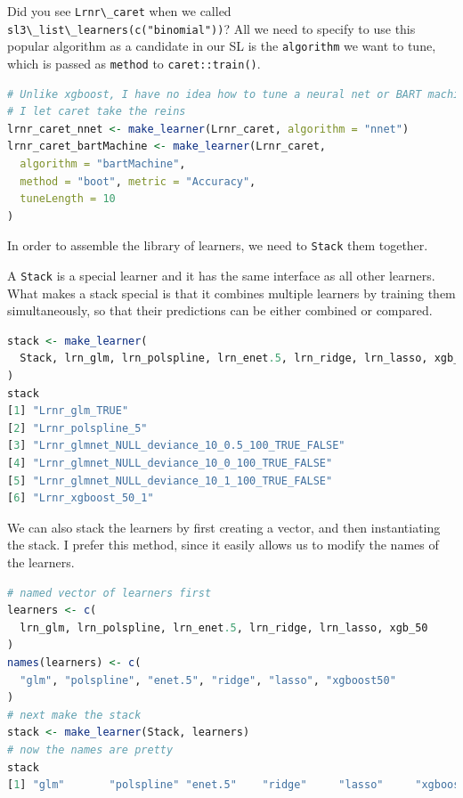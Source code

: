 \documentclass[
  12pt, krantz2,
]{krantz}
\newcommand{\passthrough}[1]{#1}
\newcommand{\1}{\mathbbm{1}}
\theoremstyle{definition}
\theoremstyle{definition}
\theoremstyle{definition}
\theoremstyle{definition}
\theoremstyle{remark}
\begin{document}
Did you see \passthrough{\lstinline!Lrnr\_caret!} when we called \passthrough{\lstinline!sl3\_list\_learners(c("binomial"))!}? All
we need to specify to use this popular algorithm as a candidate in our SL is
the \passthrough{\lstinline!algorithm!} we want to tune, which is passed as \passthrough{\lstinline!method!} to \passthrough{\lstinline!caret::train()!}.

\begin{lstlisting}[language=R]
# Unlike xgboost, I have no idea how to tune a neural net or BART machine, so
# I let caret take the reins
lrnr_caret_nnet <- make_learner(Lrnr_caret, algorithm = "nnet")
lrnr_caret_bartMachine <- make_learner(Lrnr_caret,
  algorithm = "bartMachine",
  method = "boot", metric = "Accuracy",
  tuneLength = 10
)
\end{lstlisting}

In order to assemble the library of learners, we need to \passthrough{\lstinline!Stack!} them
together.

A \passthrough{\lstinline!Stack!} is a special learner and it has the same interface as all other
learners. What makes a stack special is that it combines multiple learners by
training them simultaneously, so that their predictions can be either combined
or compared.

\begin{lstlisting}[language=R]
stack <- make_learner(
  Stack, lrn_glm, lrn_polspline, lrn_enet.5, lrn_ridge, lrn_lasso, xgb_50
)
stack
[1] "Lrnr_glm_TRUE"                                  
[2] "Lrnr_polspline_5"                               
[3] "Lrnr_glmnet_NULL_deviance_10_0.5_100_TRUE_FALSE"
[4] "Lrnr_glmnet_NULL_deviance_10_0_100_TRUE_FALSE"  
[5] "Lrnr_glmnet_NULL_deviance_10_1_100_TRUE_FALSE"  
[6] "Lrnr_xgboost_50_1"                              
\end{lstlisting}

We can also stack the learners by first creating a vector, and then
instantiating the stack. I prefer this method, since it easily allows us to
modify the names of the learners.

\begin{lstlisting}[language=R]
# named vector of learners first
learners <- c(
  lrn_glm, lrn_polspline, lrn_enet.5, lrn_ridge, lrn_lasso, xgb_50
)
names(learners) <- c(
  "glm", "polspline", "enet.5", "ridge", "lasso", "xgboost50"
)
# next make the stack
stack <- make_learner(Stack, learners)
# now the names are pretty
stack
[1] "glm"       "polspline" "enet.5"    "ridge"     "lasso"     "xgboost50"
\end{lstlisting}
\end{document}
